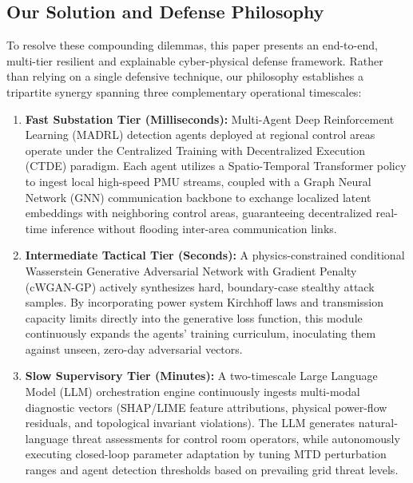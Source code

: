 \documentclass[journal,compsoc]{IEEEtran}
\begin{document}
\subsection{Our Solution and Defense Philosophy}
To resolve these compounding dilemmas, this paper presents an end-to-end, multi-tier resilient and explainable cyber-physical defense framework. Rather than relying on a single defensive technique, our philosophy establishes a tripartite synergy spanning three complementary operational timescales:
\begin{enumerate}
    \item \textbf{Fast Substation Tier (Milliseconds):} Multi-Agent Deep Reinforcement Learning (MADRL) detection agents deployed at regional control areas operate under the Centralized Training with Decentralized Execution (CTDE) paradigm. Each agent utilizes a Spatio-Temporal Transformer policy to ingest local high-speed PMU streams, coupled with a Graph Neural Network (GNN) communication backbone to exchange localized latent embeddings with neighboring control areas, guaranteeing decentralized real-time inference without flooding inter-area communication links.
    \item \textbf{Intermediate Tactical Tier (Seconds):} A physics-constrained conditional Wasserstein Generative Adversarial Network with Gradient Penalty (cWGAN-GP) \cite{ref78, ref80} actively synthesizes hard, boundary-case stealthy attack samples. By incorporating power system Kirchhoff laws and transmission capacity limits directly into the generative loss function, this module continuously expands the agents' training curriculum, inoculating them against unseen, zero-day adversarial vectors.
    \item \textbf{Slow Supervisory Tier (Minutes):} A two-timescale Large Language Model (LLM) orchestration engine \cite{ref81, ref82, ref83, ref84} continuously ingests multi-modal diagnostic vectors (SHAP/LIME feature attributions, physical power-flow residuals, and topological invariant violations). The LLM generates natural-language threat assessments for control room operators, while autonomously executing closed-loop parameter adaptation by tuning MTD perturbation ranges and agent detection thresholds based on prevailing grid threat levels.
\end{enumerate}
\end{document}
